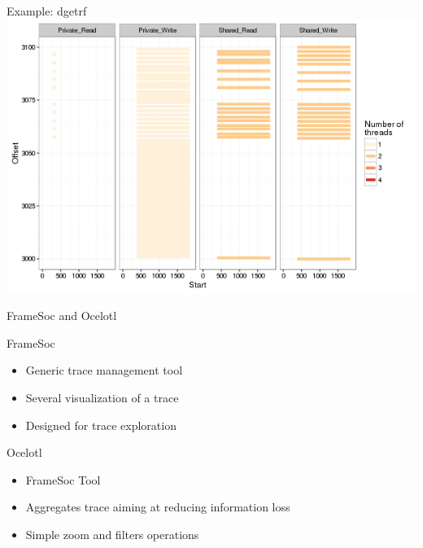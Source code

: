 \documentclass[xcolor={usenames,dvipsnames},hyperref={pdfusetitle}]{beamer}
\begin{document}
\begin{frame}{Example: dgetrf}
{{{            }{
                \includegraphics[width=\textwidth]{labbook-slides/intensity_Share_dgetrf_zoom-init1}
            }
        }
    }
    \pause
    \pause
    \pause
\end{frame}%

\begin{frame}{FrameSoc and Ocelotl}
    \begin{block}{FrameSoc~\cite{Pagano14frameSoC}}
        \begin{itemize}
            \item Generic trace management tool
            \item Several visualization of a trace
            \item Designed for trace exploration
        \end{itemize}
    \end{block}
    \pause
    \begin{alertblock}{Ocelotl~\cite{Dosimont14Ocelotl}}
        \begin{itemize}
            \item FrameSoc Tool
            \item Aggregates trace aiming at reducing information loss
            \item Simple zoom and filters operations
        \end{itemize}
    \end{alertblock}
\end{frame}
\end{document}

